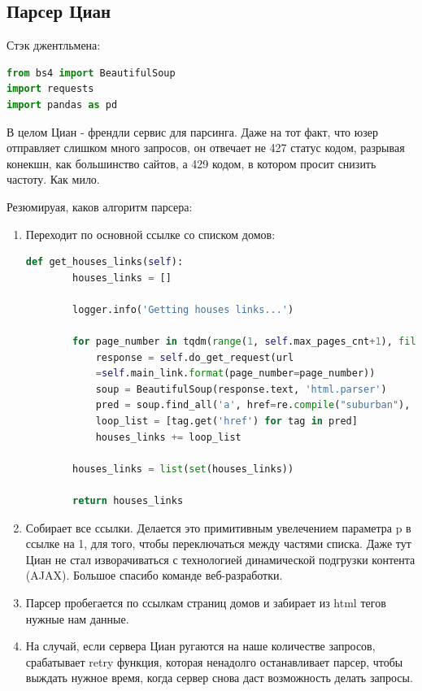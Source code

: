 \documentclass{article}
\begin{document}
\subsection{Парсер Циан}

Стэк джентльмена:
\begin{lstlisting}[language=Python, label=code:example]
from bs4 import BeautifulSoup
import requests  
import pandas as pd 
\end{lstlisting}


В целом Циан - френдли сервис для парсинга. Даже на тот факт, что юзер отправляет слишком много запросов, он отвечает не 427 статус кодом, разрывая конекшн, как большинство сайтов, а 429 кодом, в котором просит снизить частоту. Как мило.

Резюмируая, каков алгоритм парсера:
\begin{enumerate}
    \item Переходит по основной ссылке со списком домов:
        \begin{lstlisting}[language=Python]
def get_houses_links(self):
        houses_links = []

        logger.info('Getting houses links...')

        for page_number in tqdm(range(1, self.max_pages_cnt+1), file=sys.stdout):
            response = self.do_get_request(url
            =self.main_link.format(page_number=page_number))
            soup = BeautifulSoup(response.text, 'html.parser')
            pred = soup.find_all('a', href=re.compile("suburban"), class_='_93444fe79c--link--VtWj6')
            loop_list = [tag.get('href') for tag in pred]
            houses_links += loop_list

        houses_links = list(set(houses_links))

        return houses_links
        \end{lstlisting}
    \item Собирает все ссылки. Делается это примитивным увелечением параметра p в ссылке на 1, для того, чтобы переключаться между частями списка. Даже тут Циан не стал изворачиваться с технологией динамической подгрузки контента (AJAX). Большое спасибо команде веб-разработки.
    \item Парсер пробегается по ссылкам страниц домов и забирает из html тегов нужные нам данные.
    \item На случай, если сервера Циан ругаются на наше количестве запросов, срабатывает retry функция, которая ненадолго останавливает парсер, чтобы выждать нужное время, когда сервер снова даст возможность делать запросы.
\end{enumerate}
\end{document}
